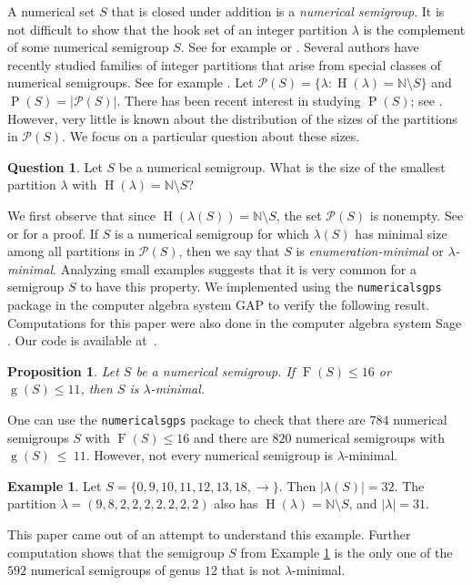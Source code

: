 \documentclass{amsproc}
\newcommand{\N}{\mathbb{N}}
\DeclareMathOperator{\F}{F}
\DeclareMathOperator{\g}{g}
\DeclareMathOperator{\Hook}{H}
\DeclareMathOperator{\Pa}{P}
\newtheorem{prop}[theorem]{Proposition}
\theoremstyle{definition}
\newtheorem{example}[theorem]{Example}
\newtheorem{question}{Question}
\theoremstyle{remark}
\numberwithin{equation}{section}
\begin{document}
A numerical set $S$ that is closed under addition is a \emph{numerical semigroup}.  It is not difficult to show that the hook set of an integer partition $\lambda$ is the complement of some numerical semigroup $S$.  See for example \cite{KeithNath} or \cite[Proposition 4]{CONSTANTIN201799}.  Several authors have recently studied families of integer partitions that arise from special classes of numerical semigroups.  See for example \cite{BNST, ArfPartition}.  Let $\mathcal{P}(S) = \{\lambda\colon \Hook(\lambda) = \N \setminus S\}$ and $\Pa(S) = |\mathcal{P}(S)|$. There has been recent interest in studying $\Pa(S)$; see \cite{chen2023enumeratingnumericalsetsassociated,ChenAsymptoticGrowth,CONSTANTIN201799,doi:10.1080/00927872.2021.1918136}. However, very little is known about the distribution of the sizes of the partitions in $\mathcal{P}(S)$.  We focus on a particular question about these sizes.
\begin{question}\label{Q:1}
Let $S$ be a numerical semigroup.  What is the size of the smallest partition $\lambda$ with $\Hook(\lambda) = \N \setminus S$?
\end{question}

We first observe that since $\Hook(\lambda(S)) = \N \setminus S$, the set $\mathcal{P}(S)$ is nonempty.  See \cite[Proposition 4]{CONSTANTIN201799} or \cite[Proposition 1]{MarzuolaMiller} for a proof.  If $S$ is a numerical semigroup for which $\lambda(S)$ has minimal size among all partitions in $\mathcal{P}(S)$, then we say that $S$ is \emph{enumeration-minimal} or \emph{$\lambda$-minimal}.  Analyzing small examples suggests that it is very common for a semigroup $S$ to have this property.
We implemented \cite[Algorithm 5.1]{chen2023enumeratingnumericalsetsassociated} using the \texttt{numericalsgps} package \cite{NumericalSgps} in the computer algebra system GAP \cite{GAP} to verify the following result.  Computations for this paper were also done in the computer algebra system Sage \cite{sagemath10.6beta8}. Our code is available at~\cite{DDeepuS2025LambdaMinimality}.
\begin{prop}
\label{prop:small minimal}
Let $S$ be a numerical semigroup.  If $\F(S) \le 16$ or $\g(S) \le 11$, then $S$ is $\lambda$-minimal.
\end{prop}

One can use the \texttt{numericalsgps} package to check that there are $784$ numerical semigroups $S$ with $\F(S) \le 16$ and there are $820$ numerical semigroups with $\g(S)~\le~11$. 
 However, not every numerical semigroup is $\lambda$-minimal.
\begin{example}\label{ex:non_lam}
Let $S = \{0,9,10,11,12,13,18,\rightarrow\}$.  Then $|\lambda(S)| = 32$.  The partition $\lambda = (9,8,2,2,2,2,2,2,2)$ also has $\Hook(\lambda) = \N \setminus S$, and $|\lambda| = 31$.
\end{example}
\noindent This paper came out of an attempt to understand this example.  Further computation shows that the semigroup $S$ from Example \ref{ex:non_lam} is the only one of the $592$ numerical semigroups of genus $12$ that is not $\lambda$-minimal.  
\end{document}
